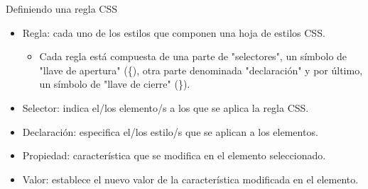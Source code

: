 \documentclass[aspectratio=43,10pt,t]{beamer}
\begin{document}
\begin{frame}{Definiendo una regla CSS}\relax
\begingroup
{}
\begin{itemize}
  \item\relax Regla: cada uno de los estilos que componen una hoja de estilos CSS. 
  \begin{itemize}
    \item\relax Cada regla está compuesta de una parte de "selectores", un símbolo de "llave de apertura" (\{), otra parte denominada "declaración" y por último, un símbolo de "llave de cierre" (\}).
  \end{itemize}
  \item\relax Selector: indica el/los elemento/s a los que se aplica la regla CSS.
  \item\relax Declaración: especifica el/los estilo/s que se aplican a los elementos.
  \item\relax Propiedad: característica que se modifica en el elemento seleccionado.
  \item\relax Valor: establece el nuevo valor de la característica modificada en el elemento.
\end{itemize}
\endgroup
{}
\end{frame}
\end{document}
